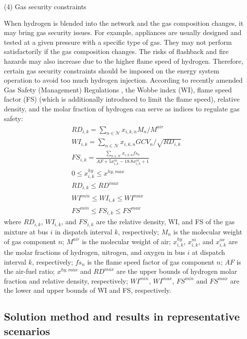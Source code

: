 \documentclass[sn-mathphys,Numbered]{sn-jnl}%
\theoremstyle{thmstyleone}%
\theoremstyle{thmstyletwo}%
\theoremstyle{thmstylethree}%
\begin{document}
(4) Gas security constraints

When hydrogen is blended into the network and the gas composition changes, it may bring gas security issues. For example, appliances are usually designed and
tested at a given pressure with a specific type of gas. They
may not perform satisfactorily if the gas composition changes. The risks of flashback and fire hazards may also increase due to the higher flame speed of hydrogen. Therefore, certain gas security constraints should be imposed on the energy system operation to avoid too much hydrogen injection. According to recently amended Gas Safety (Management) Regulations \cite{GasSafetyRegulations}, the Wobbe index (WI), flame speed factor (FS) (which is additionally introduced to limit the flame speed), relative density, and the molar fraction of hydrogen can serve as indices to regulate gas safety:
\begin{gather}
    RD_{i,k} = \sum_{n \in \mathcal{N}} x_{i,k,n} M_n / M^{air}
\label{eq relative density} \\
    WI_{i,k} = \sum_{n \in \mathcal{N}} x_{i,k,n} GCV_n / \sqrt{RD_{i,k}}
\label{eq WI} \\
    FS_{i,k} = \frac{\sum_{n \in \mathcal{N}}{x_{i,k,n} fs_n }} {AF+5x_{i,k}^{ni}-18.8x_{i,k}^{ox}+1}
\label{eq FS} \\
    0 \leq x_{i,k}^{hy} \leq x^{hy,max}
\label{eq hydrogen fraction limit}\\
    RD_{i,k} \leq  RD^{max}
\label{eq relative density limit}\\
    WI^{min} \leq WI_{i,k} \leq WI^{max}
\label{eq WI limit}\\
    FS^{min} \leq FS_{i,k} \leq FS^{max}
\label{eq flame speed limit}
\end{gather}
where $RD_{i,k}$, $WI_{i,k}$, and $FS_{i,k}$ are the relative density, WI, and FS of the gas mixture at bus $i$ in dispatch interval $k$, respectively; $M_n$ is the molecular weight of gas component $n$; $M^{air}$ is the molecular weight of air; $x_{i,k}^{hy}$, $x_{i,k}^{ni}$, and $x_{i,k}^{ox}$ are the molar fractions of hydrogen, nitrogen, and oxygen in bus $i$ at dispatch interval $k$, respectively; $fs_n$ is the flame speed factor of gas component $n$; $AF$ is the air-fuel ratio; $x^{hy,max}$ and $RD^{max}$ are the upper bounds of hydrogen molar fraction and relative density, respectively; $WI^{min}$, $WI^{max}$, $FS^{min}$ and $FS^{max}$ are the lower and upper bounds of WI and FS, respectively. 

\subsection{Solution method and results in representative scenarios}
\end{document}
